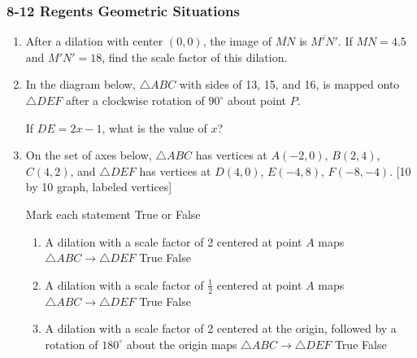 \documentclass[12pt, twoside]{article}
\begin{document}
\subsubsection*{8-12 Regents Geometric Situations}
  \begin{enumerate}

  \item After a dilation with center $(0,0)$, the image of $\overline{MN}$ is $\overline{M'N'}$. If $MN=4.5$ and $M'N'=18$, find the scale factor of this dilation.

  \item In the diagram below, $\triangle ABC$ with sides of 13, 15, and 16, is mapped onto $\triangle DEF$ after a clockwise rotation of $90^\circ$ about point $P$.
    \begin{center}
    \end{center}

    If $DE=2x-1$, what is the value of $x$?

  \item On the set of axes below, $\triangle ABC$ has vertices at $A(-2,0)$, $B(2,4)$, $C(4,2)$, and $\triangle DEF$ has vertices at $D(4,0)$, $E(-4,8)$, $F(-8,-4)$.
    [10 by 10 graph, labeled vertices]

    Mark each statement True or False
      \begin{enumerate}
        \item A dilation with a scale factor of 2 centered at point $A$ maps $\triangle ABC \rightarrow \triangle DEF$ \hfill True \quad False
        \item A dilation with a scale factor of $\frac{1}{2}$ centered at point $A$ maps $\triangle ABC \rightarrow \triangle DEF$ \hfill True \quad False
        \item A dilation with a scale factor of 2 centered at the origin, followed by a rotation of $180^\circ$ about the origin maps $\triangle ABC \rightarrow \triangle DEF$ \hfill True \quad False
      \end{enumerate}


\end{enumerate}
\end{document}
